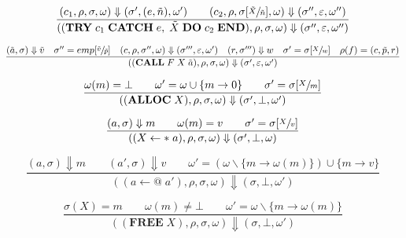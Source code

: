 \begin{equation}\label{eqn:op-catch}
\frac{(c_1, \rho, \sigma, \omega) \Downarrow (\sigma', (e, \tilde{n}), \omega') \qquad (c_2, \rho, \sigma[\sfrac{\tilde{X}}{\tilde{n}}], \omega) \Downarrow (\sigma'', \varepsilon, \omega'')}{((\textbf{TRY}\; c_1\; \textbf{CATCH}\; e,\; \tilde{X}\; \textbf{DO}\; c_2\; \textbf{END}), \rho, \sigma, \omega) \Downarrow (\sigma'', \varepsilon, \omega'')}
\end{equation}

\begin{equation}
\frac
{(\tilde{a},\sigma) \Downarrow \tilde{v} \quad \sigma''= emp[\sfrac{\tilde{v}}{\tilde{p}}] \quad (c, \rho, \sigma'', \omega) \Downarrow (\sigma''', \varepsilon, \omega') \quad (r,\sigma''') \Downarrow w \quad \sigma' = \sigma[\sfrac{X}{w}] \quad \rho(f) = (c, \tilde{p}, r)}
{((\textbf{CALL}\; F \; X  \; \tilde{a}), \rho, \sigma, \omega) \Downarrow (\sigma', \varepsilon, \omega')}
\end{equation}

\begin{equation}
\frac{\omega(m)=\bot \qquad \omega'=\omega\cup\{m \rightarrow 0\} \qquad \sigma' = \sigma[\sfrac{X}{m}]}{((\textbf{ALLOC}\;X), \rho, \sigma, \omega) \Downarrow (\sigma', \bot, \omega')}
\end{equation}

\begin{equation}
\frac{(a,\sigma) \Downarrow m \qquad \omega(m)=v \qquad \sigma'=\sigma[\sfrac{X}{v}]}{((X\leftarrow*\;a), \rho, \sigma, \omega) \Downarrow (\sigma', \bot, \omega)}
\end{equation}

\begin{equation}
\frac{(a,\sigma)\Downarrow m \qquad (a',\sigma)\Downarrow v \qquad \omega'=(\omega\backslash\{m\rightarrow\omega(m)\})\cup\{m\rightarrow v\}}{((a\leftarrow@\;a'), \rho, \sigma, \omega) \Downarrow (\sigma, \bot, \omega')}
\end{equation}

\begin{equation}
\frac{\sigma(X)=m \qquad \omega(m)\neq\bot \qquad \omega'=\omega\backslash\{m\rightarrow\omega(m)\}}{((\textbf{FREE}\;X), \rho, \sigma, \omega) \Downarrow (\sigma, \bot, \omega')}
\end{equation}